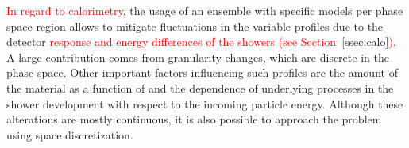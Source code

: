 \textcolor{red}{In regard to calorimetry}, the usage of an ensemble with specific models per
phase space region allows to mitigate fluctuations in the variable profiles
due to the detector \textcolor{red}{response and energy differences of the showers (see Section~\ref{ssec:calo}).}
A large contribution comes from granularity changes, which are discrete
in the phase space. Other important factors 
influencing such profiles are the
amount of the material as a function of \abseta{} and the dependence of
underlying processes in the shower development with respect to the incoming
particle energy. Although these alterations are mostly continuous, it is also
possible to approach the problem using space discretization.


